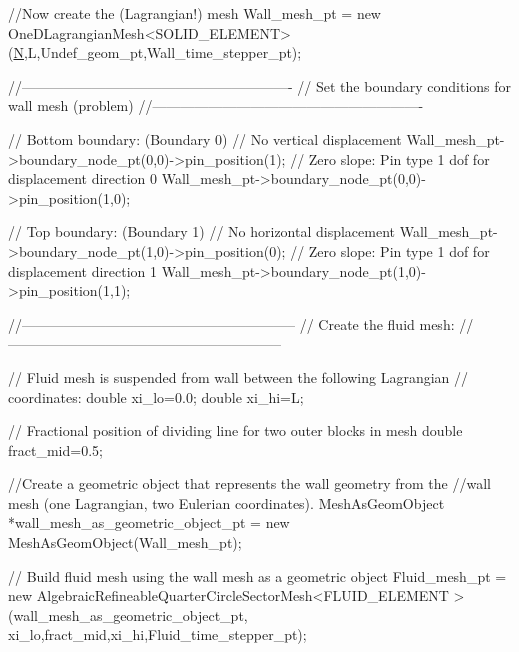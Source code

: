 \begin{DoxyCodeInclude}
{ \textcolor{comment}{//Now create the (Lagrangian!) mesh}
 Wall\_mesh\_pt = \textcolor{keyword}{new} 
  OneDLagrangianMesh<SOLID\_ELEMENT>(\hyperlink{namespaceoomph_1_1SarahBL_a3f2e6fdba588e1883d317f6e0cd7f32f}{N},L,Undef\_geom\_pt,Wall\_time\_stepper\_pt);

 \textcolor{comment}{//----------------------------------------------------------}
 \textcolor{comment}{// Set the boundary conditions for wall mesh (problem)}
 \textcolor{comment}{//----------------------------------------------------------}
 
 \textcolor{comment}{// Bottom boundary: (Boundary 0)}
 \textcolor{comment}{// No vertical displacement}
 Wall\_mesh\_pt->boundary\_node\_pt(0,0)->pin\_position(1);
 \textcolor{comment}{// Zero slope: Pin type 1 dof for displacement direction 0 }
 Wall\_mesh\_pt->boundary\_node\_pt(0,0)->pin\_position(1,0);
 
 \textcolor{comment}{// Top boundary: (Boundary 1)}
 \textcolor{comment}{// No horizontal displacement}
 Wall\_mesh\_pt->boundary\_node\_pt(1,0)->pin\_position(0);
 \textcolor{comment}{// Zero slope: Pin type 1 dof for displacement direction 1}
 Wall\_mesh\_pt->boundary\_node\_pt(1,0)->pin\_position(1,1);


 \textcolor{comment}{//-----------------------------------------------------------}
 \textcolor{comment}{// Create the fluid mesh:}
 \textcolor{comment}{//-----------------------------------------------------------}

 \textcolor{comment}{// Fluid mesh is suspended from wall between the following Lagrangian}
 \textcolor{comment}{// coordinates:}
 \textcolor{keywordtype}{double} xi\_lo=0.0;
 \textcolor{keywordtype}{double} xi\_hi=L;

 \textcolor{comment}{// Fractional position of dividing line for two outer blocks in mesh}
 \textcolor{keywordtype}{double} fract\_mid=0.5;
 
 \textcolor{comment}{//Create a geometric object that represents the wall geometry from the}
 \textcolor{comment}{//wall mesh (one Lagrangian, two Eulerian coordinates).}
 MeshAsGeomObject *wall\_mesh\_as\_geometric\_object\_pt
  = \textcolor{keyword}{new} MeshAsGeomObject(Wall\_mesh\_pt);

 \textcolor{comment}{// Build fluid mesh using the wall mesh as a geometric object}
 Fluid\_mesh\_pt = \textcolor{keyword}{new} AlgebraicRefineableQuarterCircleSectorMesh<FLUID\_ELEMENT >
  (wall\_mesh\_as\_geometric\_object\_pt,
   xi\_lo,fract\_mid,xi\_hi,Fluid\_time\_stepper\_pt);

}
\end{DoxyCodeInclude}
